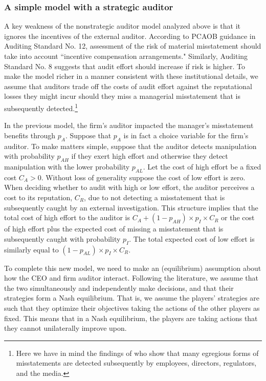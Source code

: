\subsubsection{A simple model with a strategic auditor}
A key weakness of the nonstrategic auditor model analyzed above is that it ignores the incentives of the  external auditor.
According to PCAOB guidance in Auditing Standard No. 12, assessment of the risk of material misstatement should take into account ``incentive compensation arrangements."
Similarly, Auditing Standard No. 8 suggests that audit effort should increase if risk is higher.
To make the model richer in a manner consistent with these institutional details, we assume that auditors trade off the costs of audit effort against the reputational losses they might incur should they miss a managerial misstatement that is subsequently detected.\footnote{
Here we have in mind the findings of \citet{Dyck:2010kh} who show that many egregious forms of misstatements are detected subsequently by employees, directors, regulators, and the media.} 

In the previous model, the firm's auditor impacted the manager's misstatement benefits through $p_A$. 
Suppose that $p_A$ is in fact a choice variable for the firm's auditor. 
To make matters simple, suppose that the auditor detects manipulation with probability $p_{AH}$ if they exert high effort and  otherwise they detect manipulation with the lower probability $p_{AL}$. 
Let the cost of high effort be a fixed cost $C_A > 0$. 
Without loss of generality suppose the cost of low effort is zero. 
When deciding whether to audit with high or low effort, the auditor perceives a cost to its reputation, $C_R$, due to not detecting a misstatement that is subsequently caught by an external investigation. 
This structure implies that the total cost of high effort to the auditor is $C_A + (1-p_{AH}) \times p_I \times C_R$ or the cost of high effort plus the expected cost of missing a misstatement that is subsequently caught with probability $p_I$. 
The total expected cost of
low effort is similarly equal to $(1-p_{AL}) \times p_I \times C_R$. 

To complete this new model, we need to make an (equilibrium) assumption about how the CEO and firm auditor interact. 
Following the literature, we assume that the two simultaneously and independently make decisions, and that their strategies form a Nash equilibrium.
That is, we assume the players' strategies are such that they optimize their objectives  taking the actions of the other players as fixed. This means that in a Nash equilibrium, the players are taking actions that they cannot unilaterally improve upon.

